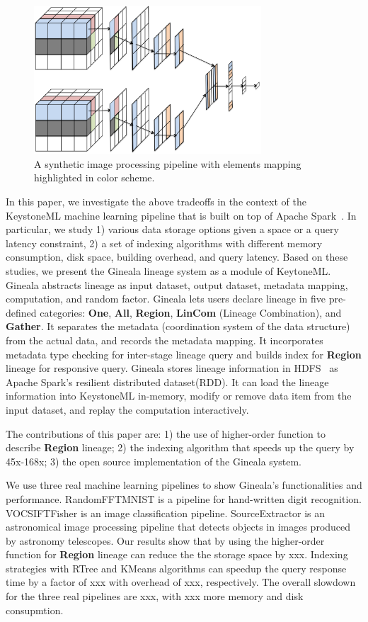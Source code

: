 \documentclass{sig-alternate}
\begin{document}
\begin{figure}[h]
\begin{center}
    \includegraphics[width=85mm]{pictures/Conceptual}
    \caption {A synthetic image processing pipeline with elements mapping highlighted in color scheme.
    \label{fig:conceptual}
}
\end{center}
\end{figure}

In this paper, we investigate the above tradeoffs in the context of the KeystoneML machine learning pipeline that is built on
top of Apache Spark~\cite{zaharia12}. In particular, we study 1) various data storage options given a space or a query latency constraint, 
2) a set of indexing algorithms with different memory consumption, disk space, building overhead, and query latency.
Based on these studies, we present the Gineala lineage system as a module of KeytoneML. 
Gineala abstracts lineage as input dataset, output dataset, metadata mapping, computation, and random factor. 
Gineala lets users declare lineage in five pre-defined categories: {\bf One}, {\bf All}, {\bf Region}, {\bf LinCom} (Lineage Combination), and {\bf Gather}.
It separates the metadata (coordination system of the data structure) from the actual data, and records the metadata mapping. 
It incorporates metadata type checking for inter-stage lineage query and builds index for {\bf Region} lineage for responsive query.
Gineala stores lineage information in HDFS~\cite{shvachko10} as Apache Spark's resilient distributed dataset(RDD). 
It can load the lineage information into KeystoneML in-memory, modify or remove data item from the input dataset, and replay
the computation interactively.

The contributions of this paper are: 
1) the use of higher-order function to describe {\bf Region} lineage;
2) the indexing algorithm that speeds up the query by 45x-168x;
3) the open source implementation of the Gineala system.

We use three real machine learning pipelines to show Gineala's functionalities and performance. 
RandomFFTMNIST is a pipeline for hand-written digit recognition. 
VOCSIFTFisher is an image classification pipeline.
SourceExtractor is an astronomical image processing pipeline that detects objects in images produced by astronomy telescopes.
Our results show that by using the higher-order function for {\bf Region} lineage can reduce the the storage space by xxx. 
Indexing strategies with RTree and KMeans algorithms can speedup the query response time by a factor of xxx with overhead of xxx, respectively.
The overall slowdown for the three real pipelines are xxx, with xxx more memory and disk consupmtion.
\end{document}
